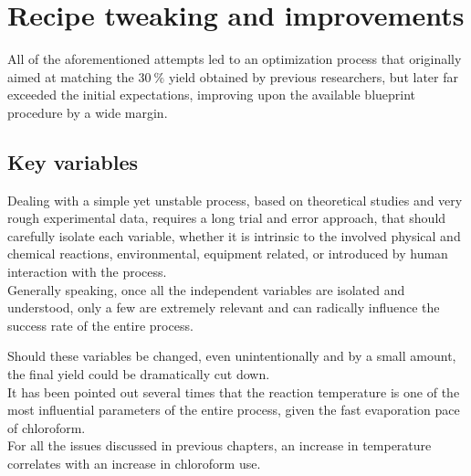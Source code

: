 \documentclass[a4paper]{article}
\begin{document}




    \clearpage

    \section{Recipe tweaking and improvements\label{recipe_improvement}}

    All of the aforementioned attempts led to an optimization process that originally aimed at 
    matching the $30 \ \%$ yield obtained by previous researchers, but later far exceeded the 
    initial expectations, improving upon the available blueprint procedure by a wide margin. 


        \subsection{Key variables\label{key_variables}}

        Dealing with a simple yet unstable process, based on theoretical studies and very rough experimental data, requires a
        long trial and error approach, that should carefully isolate each variable, whether it is intrinsic to the 
        involved physical and chemical reactions, environmental, equipment related, or introduced by human 
        interaction with the process. \\ 

        Generally speaking, once all the independent variables are isolated and understood, only a few are extremely relevant and can 
        radically influence the success rate of the entire process. 

        Should these variables be changed, even unintentionally and by a small amount, the final yield
        could be dramatically cut down. \\ 

        It has been pointed out several times that the reaction temperature is one of the most 
        influential parameters of the entire process, given the fast evaporation pace of chloroform. \\  

        For all the issues discussed in previous chapters, an increase in temperature correlates with an increase in 
        chloroform use. 
 
\end{document}

